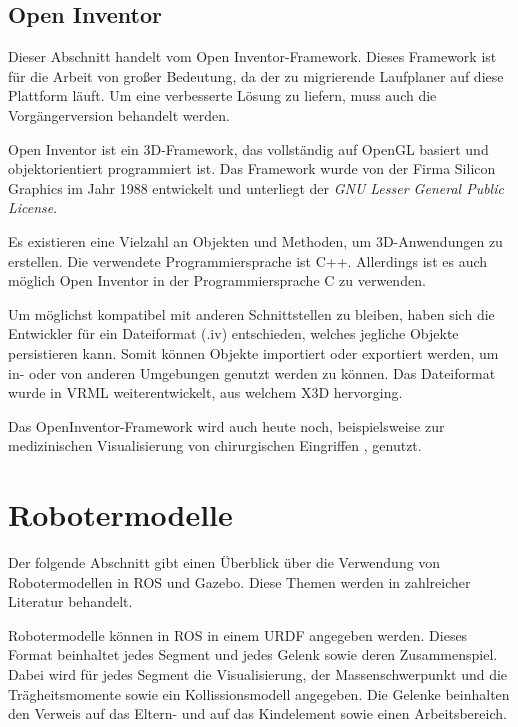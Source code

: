 \subsection{Open Inventor}

Dieser Abschnitt handelt vom Open Inventor-Framework. Dieses Framework ist für die Arbeit von großer Bedeutung, da der zu migrierende Laufplaner auf diese Plattform läuft. Um eine verbesserte Lösung zu liefern, muss auch die Vorgängerversion behandelt werden. \autocite{inventor}

Open Inventor ist ein 3D-Framework, das vollständig auf OpenGL basiert und objektorientiert programmiert ist. Das Framework wurde von der Firma Silicon Graphics im Jahr 1988 entwickelt und unterliegt der \emph{GNU Lesser General Public License}.

Es existieren eine Vielzahl an Objekten und Methoden, um 3D-Anwendungen zu erstellen. Die verwendete Programmiersprache ist C++. Allerdings ist es auch möglich Open Inventor in der Programmiersprache C zu verwenden.

Um möglichst kompatibel mit anderen Schnittstellen zu bleiben, haben sich die Entwickler für ein Dateiformat (.iv) entschieden, welches jegliche Objekte persistieren kann. Somit können Objekte importiert oder exportiert werden, um in- oder von anderen Umgebungen genutzt werden zu können. Das Dateiformat wurde in VRML weiterentwickelt, aus welchem X3D hervorging.

Das OpenInventor-Framework wird auch heute noch, beispielsweise zur medizinischen Visualisierung von chirurgischen Eingriffen \autocite{preim2001interaktive}, genutzt.

\section{Robotermodelle}

Der folgende Abschnitt gibt einen Überblick über die Verwendung von Robotermodellen in \ac{ROS} und Gazebo. Diese Themen werden in zahlreicher Literatur behandelt. \autocite{rosAnOpenSourceRobotOperatingSystem, learningROSForRoboticsProgramming, gentleIntroductionToROS}

Robotermodelle können in \ac{ROS} in einem \ac{URDF} angegeben werden. Dieses Format beinhaltet jedes Segment und jedes Gelenk sowie deren Zusammenspiel. Dabei wird für jedes Segment die Visualisierung, der Massenschwerpunkt und die Trägheitsmomente sowie ein Kollissionsmodell angegeben. Die Gelenke beinhalten den Verweis auf das Eltern- und auf das Kindelement sowie einen Arbeitsbereich.

